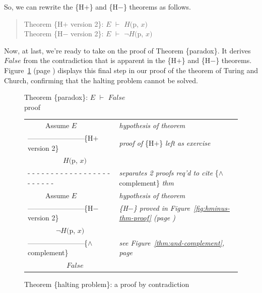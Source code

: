 So, we can rewrite the \{H$+$\} and \{H$-$\} theorems as follows.
\begin{quote}
\label{thm:HplusHminus}
Theorem \{H$+$ version 2\}: $E$ $\vdash$ $H($p, $x)$ \\
Theorem \{H$-$ version 2\}: $E$ $\vdash$ $\neg H($p, $x)$
\end{quote}

Now, at last, we're ready to take on
the proof of Theorem \{paradox\}.
It derives $False$ from the contradiction that is apparent
in the \{H$+$\} and \{H$-$\} theorems.
Figure~\ref{fig:proof-paradox-thm} (page \pageref{fig:proof-paradox-thm})
displays this final step in our proof
of the theorem of Turing and Church,
confirming that the halting problem cannot be solved.

\begin{figure}
Theorem \{paradox\}: $E$ $\vdash$ $False$\\
proof
\begin{center}
\begin{tabular}{ll}
~~~~~Assume $E$                                 &\emph{hypothesis of theorem}\\
------------------------\{H$+$ version 2\}      &\emph{proof of} \{H$+$\} \emph{left as exercise}\\
~~~~~~~~~~$H($p, $x)$                           &\\
 - - - - - - - - - - - - - - - - - - - - - - - -&\emph{separates 2 proofs req'd to cite} \{$\wedge$ complement\} \emph{thm}\\
~~~~~Assume $E$                                 &\emph{hypothesis of theorem}\\
------------------------\{H$-$ version 2\}      &\emph{\{H$-$\} proved in Figure~\ref{fig:hminus-thm-proof} (page \pageref{fig:hminus-thm-proof})}\\
~~~~~~~~$\neg H($p, $x)$                        &\\
------------------------\{$\wedge$ complement\} &\emph{see Figure~\ref{thm:and-complement}, page \pageref{thm:and-complement}}\\
~~~~~~~~~~~$False$                              &\\
\end{tabular}
\end{center}
\caption{Theorem \{halting problem\}: a proof by contradiction}
\label{fig:proof-paradox-thm}
\end{figure}

